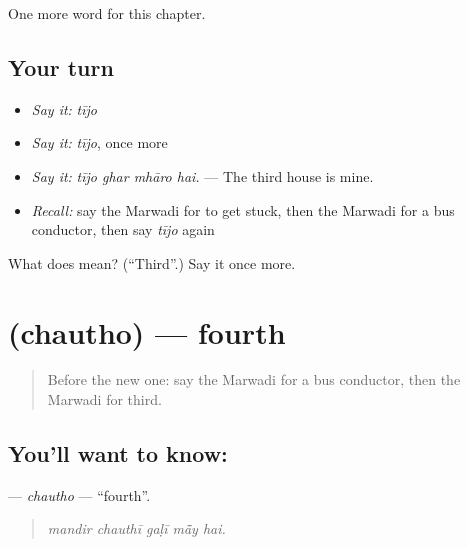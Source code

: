 \begin{grammarlens}[title={What you've built}]
One more word for this chapter.
\end{grammarlens}

\subsection*{Your turn}
\begin{itemize}
\raggedright
  \item \emph{Say it:} \emph{tījo}
  \item \emph{Say it:} \emph{tījo}, once more
  \item \emph{Say it:} \emph{tījo ghar mhāro hai.} — The third house is mine.
  \item \emph{Recall:} say the Marwadi for to get stuck, then the Marwadi for a bus conductor, then say \emph{tījo} again
\end{itemize}

\begin{tcolorbox}[breakable,colback=teal!4,colframe=teal!35!black,title={Before you move on}]
What does  mean? (\textquotedblleft{}Third\textquotedblright{}.) Say it once more.
\end{tcolorbox}
\section[\texorpdfstring{\mw{चौथो} (chautho)}{चौथो (chautho)}]{ (chautho) — fourth}

\label{lesson:MW-C206-chautho}



\begin{quote}
Before the new one: say the Marwadi for a bus conductor, then the Marwadi for third.
\end{quote}

\subsection*{You'll want to know: }
\textbf{} — \emph{chautho} — \textquotedblleft{}fourth\textquotedblright{}.

\begin{quote}
    
\end{quote}

\begin{quote}
\emph{mandir chauthī gaḷī mā̃y hai.}
\end{quote}


